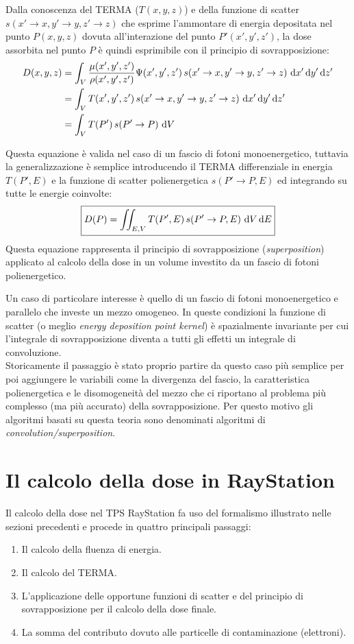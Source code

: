 {Dalla conoscenza del TERMA ($T(x,y,z)$) e della funzione di scatter $s(x'\rightarrow x, y'\rightarrow y, z'\rightarrow z)$ che esprime l'ammontare di energia depositata nel punto $P(x,y,z)$ dovuta all'interazione del punto $P'(x',y',z')$, la dose assorbita nel punto $P$ è quindi esprimibile con il principio di sovrapposizione:
\begin{align}
D(x,y,z) &=  \int_V \frac{\mu(x',y',z')}{\rho(x',y',z')} \Psi(x',y',z')\,s(x'\rightarrow x, y'\rightarrow y, z'\rightarrow z)\, \,\text{d} x' \,\text{d} y' \,\text{d} z'\\
         &= \int_V T(x',y',z')\,s(x'\rightarrow x, y'\rightarrow y, z'\rightarrow z)\, \,\text{d} x' \,\text{d} y' \,\text{d} z'\\
         &= \int_V T(P')\,s(P'\rightarrow P)\, \,\text{d} V
\end{align}

Questa equazione è valida nel caso di un fascio di fotoni monoenergetico, tuttavia la generalizzazione è semplice introducendo il TERMA differenziale in energia $T(P',E)$ e la funzione di scatter polienergetica $s(P'\rightarrow P,E)$ ed integrando su tutte le energie coinvolte:
\begin{equation}
\boxed{D(P) = \iint_{E,V} T(P',E)\,s(P'\rightarrow P,E)\, \,\text{d} V \,\text{d} E}
\label{eq:superp}
\end{equation}
Questa equazione rappresenta il principio di sovrapposizione (\textit{superposition}) applicato al calcolo della dose in un volume investito da un fascio di fotoni polienergetico.

Un caso di particolare interesse è quello di un fascio di fotoni monoenergetico e parallelo che investe un mezzo omogeneo. In queste condizioni la funzione di scatter (o meglio \textit{energy deposition point kernel}) è spazialmente invariante per cui l'integrale di sovrapposizione diventa a tutti gli effetti un integrale di convoluzione.\\
Storicamente il passaggio è stato proprio partire da questo caso più semplice per poi aggiungere le variabili come la divergenza del fascio, la caratteristica polienergetica e le disomogeneità del mezzo che ci riportano al problema più complesso (ma più accurato) della sovrapposizione. Per questo motivo gli algoritmi basati su questa teoria sono denominati algoritmi di \textit{convolution/superposition}.



\section{Il calcolo della dose in RayStation}
Il calcolo della dose nel TPS RayStation fa uso del formalismo illustrato nelle sezioni precedenti e procede in quattro principali passaggi:
\begin{enumerate}
\item Il calcolo della fluenza di energia.
\item Il calcolo del TERMA.
\item L'applicazione delle opportune funzioni di scatter e del principio di sovrapposizione per il calcolo della dose finale.
\item La somma del contributo dovuto alle particelle di contaminazione (elettroni).
\end{enumerate}

}
